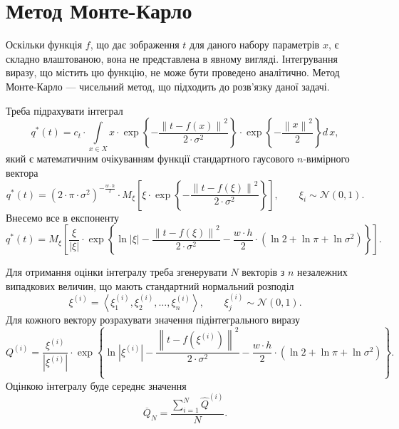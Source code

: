 \section{Метод Монте-Карло}

Оскільки функція $f$, що дає зображення $t$ для даного набору параметрів $x$,
є складно влаштованою, вона не представлена в явному вигляді.
Інтегрування виразу, що містить цю функцію, не може бути проведено аналітично.
Метод Монте-Карло --- чисельний метод, що підходить до розв'язку даної задачі.

Треба підрахувати інтеграл
\begin{equation*}
  q^* \left( t \right)
  = c_t
    \cdot \int\limits_{x \in X}
      x
      \cdot \exp{\left\{ - \frac{\left\| t - f\left( x \right) \right\|^2}
                                {2 \cdot \sigma^2} \right\}}
      \cdot \exp{\left\{ - \frac{\left\| x \right\|^2}{2} \right\}}
    d\,x,
\end{equation*}
який є математичним очікуванням функції
стандартного гаусового $n$-вимірного вектора
\begin{equation*}
  q^* \left( t \right)
  = \left( 2 \cdot \pi \cdot \sigma^2 \right)^{-\frac{w \cdot h}{2}}
    \cdot M_{\xi}\left[
      \xi
      \cdot \exp{\left\{ - \frac{\left\| t - f\left( \xi \right) \right\|^2}
        {2 \cdot \sigma^2} \right\}} \right], \qquad
    \xi_i \sim \mathcal{N}\left( 0, 1 \right).
\end{equation*}
Внесемо все в експоненту
\begin{equation*}
  q^* \left( t \right)
  = M_{\xi}\left[
    \frac{\xi}{\left| \xi \right|}
    \cdot \exp{\left\{
        \ln{\left| \xi \right|}
        - \frac{\left\| t - f\left( \xi \right) \right\|^2}{2 \cdot \sigma^2}
        - \frac{w \cdot h}{2}
          \cdot \left( \ln{2} + \ln{\pi} + \ln{\sigma^2} \right)
       \right\}
    } \right].
\end{equation*}

Для отримання оцінки інтегралу
треба згенерувати $N$ векторів з $n$ незалежних випадкових величин,
що мають стандартний нормальний розподіл
\begin{equation*}
  \xi^{\left( i \right)}
  = \left\langle \xi^{\left( i \right)}_1, \xi^{\left( i \right)}_2, \dots,
  \xi^{\left( i \right)}_n \right\rangle,\qquad
  \xi^{\left( i \right)}_j \sim \mathcal{N}\left( 0, 1 \right).
\end{equation*}
Для кожного вектору розрахувати значення підінтегрального виразу
\begin{equation*}
  Q^{\left( i \right)}
  = \frac{\xi^{\left( i \right)}}{\left| \xi^{\left( i \right)} \right|}
  \cdot \exp{\left\{
      \ln{\left| \xi^{\left( i \right)} \right|}
      - \frac{\left\| t - f\left( \xi^{\left( i \right)} \right) \right\|^2}{2 \cdot \sigma^2}
      - \frac{w \cdot h}{2}
        \cdot \left( \ln{2} + \ln{\pi} + \ln{\sigma^2} \right)
     \right\}
   }.
\end{equation*}
Оцінкою інтегралу буде середнє значення
\begin{equation*}
  \overline{Q}_N = \frac{\sum\limits_{i=1}^{N}
    \hat{Q}^{\left( i \right)}}{N}.
\end{equation*}

